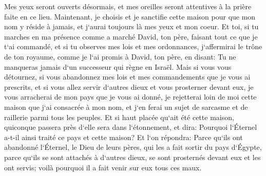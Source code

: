 \verse Mes yeux seront ouverts désormais, et mes oreilles seront attentives à la prière faite en ce lieu. 
\verse Maintenant, je choisis et je sanctifie cette maison pour que mon nom y réside à jamais, et j`aurai toujours là mes yeux et mon coeur. 
\verse Et toi, si tu marches en ma présence comme a marché David, ton père, faisant tout ce que je t`ai commandé, et si tu observes mes lois et mes ordonnances, 
\verse j`affermirai le trône de ton royaume, comme je l`ai promis à David, ton père, en disant: Tu ne manqueras jamais d`un successeur qui règne en Israël. 
\verse Mais si vous vous détournez, si vous abandonnez mes lois et mes commandements que je vous ai prescrits, et si vous allez servir d`autres dieux et vous prosterner devant eux, 
\verse je vous arracherai de mon pays que je vous ai donné, je rejetterai loin de moi cette maison que j`ai consacrée à mon nom, et j`en ferai un sujet de sarcasme et de raillerie parmi tous les peuples. 
\verse Et si haut placée qu`ait été cette maison, quiconque passera près d`elle sera dans l`étonnement, et dira: Pourquoi l`Éternel a-t-il ainsi traité ce pays et cette maison? 
\verse Et l`on répondra: Parce qu`ils ont abandonné l`Éternel, le Dieu de leurs pères, qui les a fait sortir du pays d`Égypte, parce qu`ils se sont attachés à d`autres dieux, se sont prosternés devant eux et les ont servis; voilà pourquoi il a fait venir sur eux tous ces maux. 

\chapter{}

